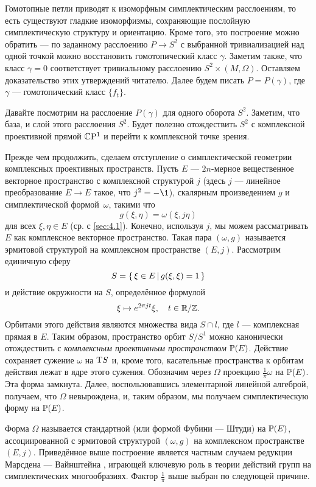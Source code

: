 Гомотопные петли приводят к изоморфным симплектическим расслоениям, то
есть существуют гладкие изоморфизмы, сохраняющие послойную
симплектическую структуру и ориентацию.
Кроме того, это построение можно обратить — по заданному расслоению
$P \to S^2$ с выбранной тривиализацией над одной точкой можно
восстановить гомотопический класс $\gamma$.
Заметим также, что класс $\gamma = 0$ соответствует тривиальному
расслоению $S^2 \times (M, \Omega)$.
Оставляем доказательство этих утверждений читателю.
Далее будем писать $P = P(\gamma)$, где $\gamma$ — гомотопический класс
$\{f_t\}$.

Давайте посмотрим на расслоение $P(\gamma)$ для одного оборота $S^2$.
Заметим, что база, и слой этого расслоения $S^2$.
Будет полезно отождествить $S^2$ с комплексной проективной прямой $\mathbb{C}\mathrm{P}^1$ и перейти к комплексной точке зрения.

Прежде чем продолжить, сделаем отступление о симплектической геометрии
комплексных проективных пространств. 
Пусть $E$ — $2n$-мерное вещественное векторное пространство с
комплексной структурой $j$ 
(здесь $j$ — линейное преобразование $E\to E$ такое, что $j^2 = -\1$),
скалярным произведением $g$ и симплектической формой~$\omega$, такими что
\[g(\xi, \eta ) = \omega(\xi, j\eta)\]
для всех $\xi, \eta \in E$ (ср. с \ref{sec:4.1}).
Конечно, используя $j$, мы можем рассматривать $E$ как комплексное
векторное пространство. 
Такая пара $(\omega, g)$ называется эрмитовой структурой на
комплексном пространстве $(E, j)$.
Рассмотрим единичную сферу
\[S = \left\{ \,{\xi \in E}\, \middle| \,{g(\xi, \xi) = 1}\, \right\}\]
и действие окружности на $S$, определённое формулой 
\[\xi \mapsto e^{2\pi jt} \xi,\quad t \in \mathbb{R}/\mathbb{Z}.\]
Орбитами этого действия являются множества вида $S \cap l$, где $l$ — комплексная прямая в $E$. 
Таким образом, пространство орбит $S/S^1$ можно канонически отождествить с \emph{комплексным проективным пространством} $\mathbb{P}(E)$.
Действие сохраняет сужение $\omega$ на $\mathrm{T} S$ и, кроме того, касательные пространства к орбитам действия лежат в ядре этого сужения.
Обозначим через $\Omega$ проекцию $\tfrac1\pi \omega$ на $\mathbb{P}(E)$.
Эта форма замкнута.
Далее, воспользовавшись элементарной линейной алгеброй, получаем, что $\Omega$ невырождена, и, таким образом, мы получаем симплектическую форму на $\mathbb{P}(E)$. 

Форма $\Omega$ называется стандартной (или формой Фубини — Штуди) на $\mathbb{P}(E)$, ассоциированной с эрмитовой структурой $(\omega, g)$ на комплексном пространстве $(E, j)$.
Приведённое выше построение является частным случаем редукции Марсдена — Вайнштейна \cite{MS}, играющей ключевую роль в теории действий
групп на симплектических многообразиях.
Фактор $\tfrac1\pi$ выше выбран по следующей причине.

